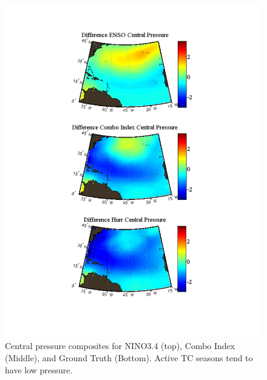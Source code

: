 \documentclass[]{article}
\begin{document}
\begin{figure}[ht]
\begin{minipage}[b]{0.55\linewidth}
\includegraphics[width=\textwidth]{figures/comboIndex/composites/compareMDRCompositesCentralPressure.pdf}
\caption{Central pressure composites for NINO3.4 (top), Combo Index (Middle), and Ground Truth (Bottom). Active TC seasons tend to have low pressure.}
\label{fig:pres_comp}
\end{minipage}
\hspace{0.3cm}
\begin{minipage}[b]{0.55\linewidth}

\end{minipage}
\end{figure}
\end{document}
